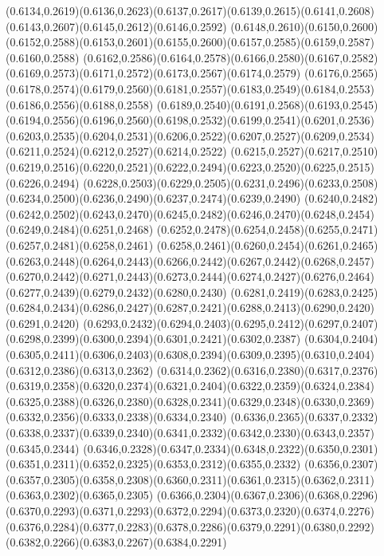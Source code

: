(0.6134,0.2619)(0.6136,0.2623)(0.6137,0.2617)(0.6139,0.2615)(0.6141,0.2608)(0.6143,0.2607)(0.6145,0.2612)(0.6146,0.2592)
(0.6148,0.2610)(0.6150,0.2600)(0.6152,0.2588)(0.6153,0.2601)(0.6155,0.2600)(0.6157,0.2585)(0.6159,0.2587)(0.6160,0.2588)
(0.6162,0.2586)(0.6164,0.2578)(0.6166,0.2580)(0.6167,0.2582)(0.6169,0.2573)(0.6171,0.2572)(0.6173,0.2567)(0.6174,0.2579)
(0.6176,0.2565)(0.6178,0.2574)(0.6179,0.2560)(0.6181,0.2557)(0.6183,0.2549)(0.6184,0.2553)(0.6186,0.2556)(0.6188,0.2558)
(0.6189,0.2540)(0.6191,0.2568)(0.6193,0.2545)(0.6194,0.2556)(0.6196,0.2560)(0.6198,0.2532)(0.6199,0.2541)(0.6201,0.2536)
(0.6203,0.2535)(0.6204,0.2531)(0.6206,0.2522)(0.6207,0.2527)(0.6209,0.2534)(0.6211,0.2524)(0.6212,0.2527)(0.6214,0.2522)
(0.6215,0.2527)(0.6217,0.2510)(0.6219,0.2516)(0.6220,0.2521)(0.6222,0.2494)(0.6223,0.2520)(0.6225,0.2515)(0.6226,0.2494)
(0.6228,0.2503)(0.6229,0.2505)(0.6231,0.2496)(0.6233,0.2508)(0.6234,0.2500)(0.6236,0.2490)(0.6237,0.2474)(0.6239,0.2490)
(0.6240,0.2482)(0.6242,0.2502)(0.6243,0.2470)(0.6245,0.2482)(0.6246,0.2470)(0.6248,0.2454)(0.6249,0.2484)(0.6251,0.2468)
(0.6252,0.2478)(0.6254,0.2458)(0.6255,0.2471)(0.6257,0.2481)(0.6258,0.2461)
\PST@Solid(0.6258,0.2461)(0.6260,0.2454)(0.6261,0.2465)(0.6263,0.2448)(0.6264,0.2443)(0.6266,0.2442)(0.6267,0.2442)(0.6268,0.2457)
(0.6270,0.2442)(0.6271,0.2443)(0.6273,0.2444)(0.6274,0.2427)(0.6276,0.2464)(0.6277,0.2439)(0.6279,0.2432)(0.6280,0.2430)
(0.6281,0.2419)(0.6283,0.2425)(0.6284,0.2434)(0.6286,0.2427)(0.6287,0.2421)(0.6288,0.2413)(0.6290,0.2420)(0.6291,0.2420)
(0.6293,0.2432)(0.6294,0.2403)(0.6295,0.2412)(0.6297,0.2407)(0.6298,0.2399)(0.6300,0.2394)(0.6301,0.2421)(0.6302,0.2387)
(0.6304,0.2404)(0.6305,0.2411)(0.6306,0.2403)(0.6308,0.2394)(0.6309,0.2395)(0.6310,0.2404)(0.6312,0.2386)(0.6313,0.2362)
(0.6314,0.2362)(0.6316,0.2380)(0.6317,0.2376)(0.6319,0.2358)(0.6320,0.2374)(0.6321,0.2404)(0.6322,0.2359)(0.6324,0.2384)
(0.6325,0.2388)(0.6326,0.2380)(0.6328,0.2341)(0.6329,0.2348)(0.6330,0.2369)(0.6332,0.2356)(0.6333,0.2338)(0.6334,0.2340)
(0.6336,0.2365)(0.6337,0.2332)(0.6338,0.2337)(0.6339,0.2340)(0.6341,0.2332)(0.6342,0.2330)(0.6343,0.2357)(0.6345,0.2344)
(0.6346,0.2328)(0.6347,0.2334)(0.6348,0.2322)(0.6350,0.2301)(0.6351,0.2311)(0.6352,0.2325)(0.6353,0.2312)(0.6355,0.2332)
(0.6356,0.2307)(0.6357,0.2305)(0.6358,0.2308)(0.6360,0.2311)(0.6361,0.2315)(0.6362,0.2311)(0.6363,0.2302)(0.6365,0.2305)
(0.6366,0.2304)(0.6367,0.2306)(0.6368,0.2296)(0.6370,0.2293)(0.6371,0.2293)(0.6372,0.2294)(0.6373,0.2320)(0.6374,0.2276)
(0.6376,0.2284)(0.6377,0.2283)(0.6378,0.2286)(0.6379,0.2291)(0.6380,0.2292)(0.6382,0.2266)(0.6383,0.2267)(0.6384,0.2291)

